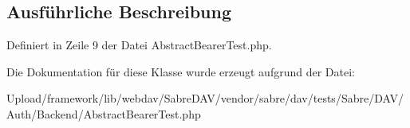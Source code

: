 \subsection{Ausführliche Beschreibung}


Definiert in Zeile 9 der Datei Abstract\+Bearer\+Test.\+php.



Die Dokumentation für diese Klasse wurde erzeugt aufgrund der Datei\+:\begin{DoxyCompactItemize}
\item 
Upload/framework/lib/webdav/\+Sabre\+D\+A\+V/vendor/sabre/dav/tests/\+Sabre/\+D\+A\+V/\+Auth/\+Backend/Abstract\+Bearer\+Test.\+php\end{DoxyCompactItemize}
